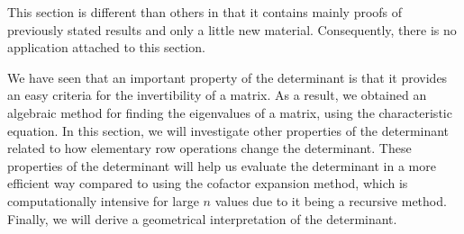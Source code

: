  \label{chap:det_properties}

\vspace*{-17 pt}

\vspace*{13 pt}




\label{sec:det_prop_intro}

This section is different than others in that it contains mainly proofs of previously stated results and only a little new material. Consequently, there is no application attached to this section.

We have seen that an important property of the determinant is that it provides an easy criteria for the invertibility of a matrix. As a result, we obtained an algebraic method for finding the eigenvalues of a matrix, using the characteristic equation. In this section, we will investigate other properties of the determinant related to how elementary row operations change the determinant. These properties of the determinant will help us evaluate the determinant in a more efficient way compared to using the cofactor expansion method, which is computationally intensive for large $n$ values due to it being a recursive method. Finally, we will derive a geometrical interpretation of the determinant.



